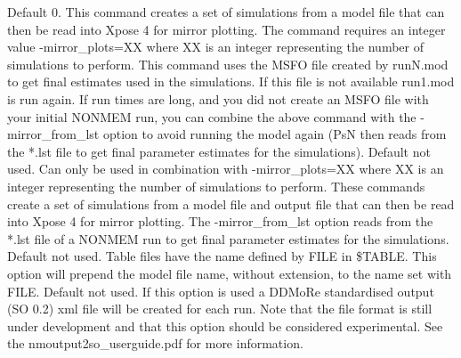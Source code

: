 \begin{optionlist}
\nextopt
{}
Default 0. This command creates a set of simulations from a model file that can then be read into Xpose 4 for mirror plotting. The command requires an integer value -mirror\_plots=XX where XX is an integer representing the number of simulations to perform. This command uses the MSFO file created by runN.mod to get final estimates used in the simulations. If this file is not available run1.mod is run again.  If run times are long, and you did not create an MSFO file with your initial NONMEM run, you can combine the above command with the -mirror\_from\_lst option to avoid running the model again (PsN then reads from the *.lst file to get final parameter estimates for the simulations). 
\nextopt
{}
Default not used. Can only be used in combination with -mirror\_plots=XX where XX is an integer representing the number of simulations to perform.  These commands create a set of simulations from a model file and output file that can then be read into Xpose 4 for mirror plotting.  The -mirror\_from\_lst option reads from the *.lst file of a NONMEM run to get final parameter estimates for the simulations. 
\nextopt
{}
Default not used. Table files have the name defined by FILE in \$TABLE. 
This option will prepend the model file name, without extension, to
the name set with FILE.
\nextopt
{}
Default not used. If this option is used a DDMoRe standardised output (SO 0.2) xml file will be created for each run. Note that the file format is still under development and that this option should be considered experimental. See the \mbox{nmoutput2so\_userguide.pdf} for more information.
\nextopt
\end{optionlist}

